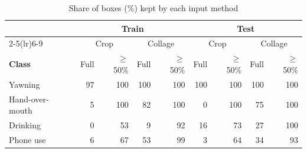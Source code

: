 \begin{table}[t]
\caption{Share of boxes (\%) kept by each input method}
\label{tab:coverage}
\centering
\footnotesize
\setlength{\tabcolsep}{3pt}
\begin{tabular}{@{}lrrrrrrrr@{}}
\toprule
 & \multicolumn{4}{c}{\textbf{Train}} & \multicolumn{4}{c}{\textbf{Test}} \\
\cmidrule(lr){2-5}\cmidrule(lr){6-9}
 & \multicolumn{2}{c}{Crop} & \multicolumn{2}{c}{Collage} & \multicolumn{2}{c}{Crop} & \multicolumn{2}{c}{Collage} \\
\textbf{Class} & Full & $\geq$50\% & Full & $\geq$50\% & Full & $\geq$50\% & Full & $\geq$50\% \\
\midrule
Yawning & 97 & 100 & 100 & 100 & 100 & 100 & 100 & 100 \\
Hand-over-mouth & 5 & 100 & 82 & 100 & 0 & 100 & 75 & 100 \\
Drinking & 0 & 53 & 9 & 92 & 16 & 73 & 27 & 100 \\
Phone use & 6 & 67 & 53 & 99 & 3 & 64 & 34 & 93 \\
\bottomrule
\end{tabular}
\end{table}
